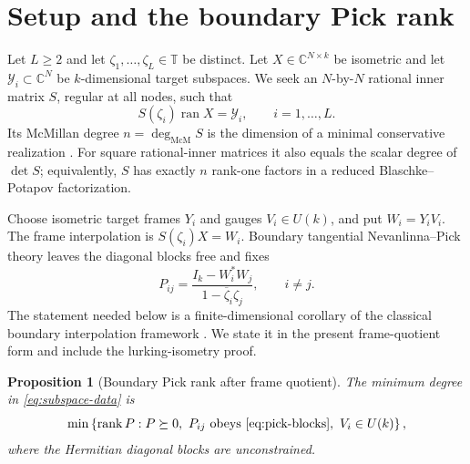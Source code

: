 \documentclass[11pt]{article}
\newtheorem{proposition}[theorem]{Proposition}
\theoremstyle{definition}
\theoremstyle{remark}
\newcommand{\C}{\mathbb C}
\newcommand{\T}{\mathbb T}
\newcommand{\rank}{\operatorname{rank}}
\newcommand{\ran}{\operatorname{ran}}
\newcommand{\mcdeg}{\deg_{\mathrm{McM}}}
\begin{document}
\section{Setup and the boundary Pick rank}

Let $L\ge2$ and let $\zeta_1,\ldots,\zeta_L\in\T$ be distinct.  Let
$X\in\C^{N\times k}$ be isometric and let
$\mathcal Y_i\subset\C^N$ be $k$-dimensional target subspaces.  We seek an
$N$-by-$N$ rational inner matrix $S$, regular at all nodes, such that
\begin{equation}\label{eq:subspace-data}
             S(\zeta_i)\ran X=\mathcal Y_i,
             \qquad i=1,\ldots,L.
\end{equation}
Its McMillan degree $n=\mcdeg S$ is the dimension of a minimal conservative
realization \cite{McMillan1952,GoughZhang2015}.  For square rational-inner
matrices it also equals the scalar degree of $\det S$; equivalently, $S$ has
exactly $n$ rank-one factors in a reduced Blaschke--Potapov factorization.

Choose isometric target frames $Y_i$ and gauges $V_i\in U(k)$, and put
$W_i=Y_iV_i$.  The frame interpolation is
$S(\zeta_i)X=W_i$.  Boundary tangential Nevanlinna--Pick theory leaves the
diagonal blocks free and fixes
\begin{equation}\label{eq:pick-blocks}
 P_{ij}=\frac{I_k-W_i^*W_j}{1-\overline\zeta_i\zeta_j},
 \qquad i\ne j.
\end{equation}
The statement needed below is a finite-dimensional corollary of the classical
boundary interpolation framework \cite{BolotnikovDym2006}.  We state it in
the present frame-quotient form and include the lurking-isometry proof.

\begin{proposition}[Boundary Pick rank after frame quotient]
\label{prop:pick-rank}
The minimum degree in \eqref{eq:subspace-data} is
\begin{equation}\label{eq:rank-min}
 \min\left\{\rank P:
 P\succeq0,\ P_{ij}\text{ obeys \eqref{eq:pick-blocks}},\
 V_i\in U(k)\right\},
\end{equation}
where the Hermitian diagonal blocks are unconstrained.
\end{proposition}
\end{document}
